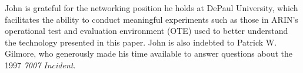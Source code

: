 \documentclass[sigconf]{acmart}
\begin{document}
\begin{acks}

John is grateful for the networking position he holds at DePaul
University, which facilitates the ability to conduct meaningful
experiments such as those in ARIN's operational test and evaluation
environment (OTE) used to better understand the technology presented in
this paper.  John is also indebted to Patrick W.  Gilmore, who
generously made his time available to answer questions about the 1997
\emph{7007 Incident}.

\end{acks}


\end{document}
